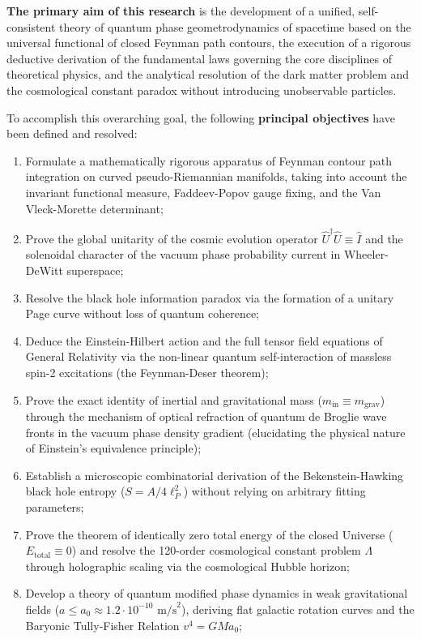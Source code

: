 \documentclass[11pt,a4paper]{article}
\theoremstyle{definition}
\begin{document}
\textbf{The primary aim of this research} is the development of a unified, self-consistent theory of quantum phase geometrodynamics of spacetime based on the universal functional of closed Feynman path contours, the execution of a rigorous deductive derivation of the fundamental laws governing the core disciplines of theoretical physics, and the analytical resolution of the dark matter problem and the cosmological constant paradox without introducing unobservable particles.

To accomplish this overarching goal, the following \textbf{principal objectives} have been defined and resolved:
\begin{enumerate}
\item Formulate a mathematically rigorous apparatus of Feynman contour path integration on curved pseudo-Riemannian manifolds, taking into account the invariant functional measure, Faddeev-Popov gauge fixing, and the Van Vleck-Morette determinant;
\item Prove the global unitarity of the cosmic evolution operator $\hat{U}^\dagger \hat{U} \equiv \hat{I}$ and the solenoidal character of the vacuum phase probability current in Wheeler-DeWitt superspace;
\item Resolve the black hole information paradox via the formation of a unitary Page curve without loss of quantum coherence;
\item Deduce the Einstein-Hilbert action and the full tensor field equations of General Relativity via the non-linear quantum self-interaction of massless spin-2 excitations (the Feynman-Deser theorem);
\item Prove the exact identity of inertial and gravitational mass ($m_{\text{in}} \equiv m_{\text{grav}}$) through the mechanism of optical refraction of quantum de Broglie wave fronts in the vacuum phase density gradient (elucidating the physical nature of Einstein's equivalence principle);
\item Establish a microscopic combinatorial derivation of the Bekenstein-Hawking black hole entropy ($S = A / 4\ell_P^2$) without relying on arbitrary fitting parameters;
\item Prove the theorem of identically zero total energy of the closed Universe ($E_{\text{total}} \equiv 0$) and resolve the 120-order cosmological constant problem $\Lambda$ through holographic scaling via the cosmological Hubble horizon;
\item Develop a theory of quantum modified phase dynamics in weak gravitational fields ($a \le a_0 \approx 1.2 \cdot 10^{-10}\text{ m/s}^2$), deriving flat galactic rotation curves and the Baryonic Tully-Fisher Relation $v^4 = G M a_0$;

\end{enumerate}
\end{document}
